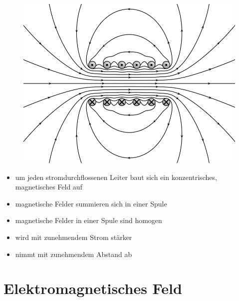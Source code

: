 \begin{frame}
\begin{center}
\begin{minipage}{0.45\textwidth}
      \begin{center}
        \begin{figure}
          \includegraphics[width=\textwidth,height=.3\textheight,keepaspectratio]{e08/VFPt_cylindrical_coil_real.png}\\
        \end{figure}
      \end{center}
    \end{minipage}

    \bigskip

    \begin{itemize}
      \item um jeden stromdurchflossenen Leiter baut sich ein konzentrisches, magnetisches Feld auf
      \item magnetische Felder summieren sich in einer Spule
      \item magnetische Felder in einer Spule sind homogen
      \item wird mit zunehmendem Strom stärker
      \item nimmt mit zunehmendem Abstand ab
    \end{itemize}

  \end{center}
\end{frame}

\section*{Elektro\-magnetisches Feld}

